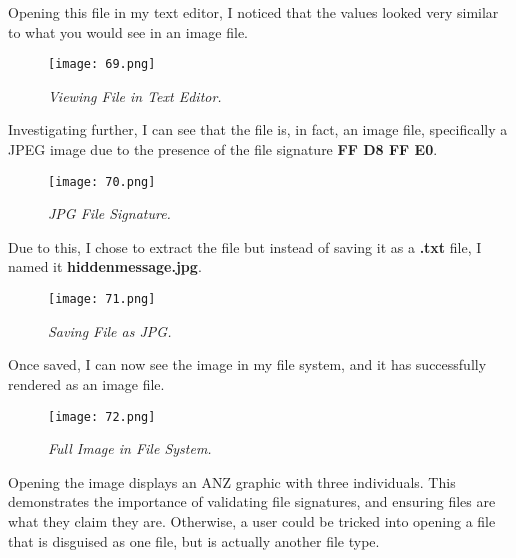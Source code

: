Opening this file in my text editor, I noticed that the values looked very similar to what you would see in an image file.

\begin{figure}[H]
    \setlength{\abovecaptionskip}{20pt}
    \setlength{\belowcaptionskip}{0pt}
    \centering
    \texttt{[image: 69.png]}
    \captionsetup{justification=centering}
    \caption{\textit{Viewing File in Text Editor.}}
    \label{fig:69}
\end{figure}
\vspace{-10pt}

Investigating further, I can see that the file is, in fact, an image file, specifically a JPEG image due to the presence of the file signature \textbf{FF D8 FF E0}.

\begin{figure}[H]
    \setlength{\abovecaptionskip}{20pt}
    \setlength{\belowcaptionskip}{0pt}
    \centering
    \texttt{[image: 70.png]}
    \captionsetup{justification=centering}
    \caption{\textit{JPG File Signature.}}
    \label{fig:70}
\end{figure}
\vspace{-10pt}

Due to this, I chose to extract the file but instead of saving it as a \textbf{.txt} file, I named it \textbf{hiddenmessage.jpg}.

\begin{figure}[H]
    \setlength{\abovecaptionskip}{20pt}
    \setlength{\belowcaptionskip}{0pt}
    \centering
    \texttt{[image: 71.png]}
    \captionsetup{justification=centering}
    \caption{\textit{Saving File as JPG.}}
    \label{fig:71}
\end{figure}
\vspace{-10pt}

Once saved, I can now see the image in my file system, and it has successfully rendered as an image file.

\begin{figure}[H]
    \setlength{\abovecaptionskip}{20pt}
    \setlength{\belowcaptionskip}{0pt}
    \centering
    \texttt{[image: 72.png]}
    \captionsetup{justification=centering}
    \caption{\textit{Full Image in File System.}}
    \label{fig:72}
\end{figure}
\vspace{-10pt}

Opening the image displays an ANZ graphic with three individuals. This demonstrates the importance of validating file signatures, and ensuring files are what they claim they are. Otherwise, a user could be tricked into opening a file that is disguised as one file, but is actually another file type. 

